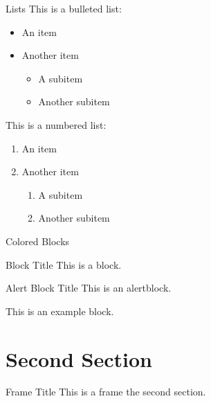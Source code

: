 \documentclass{beamer}
\begin{document}
    \begin{frame}{Lists}
        This is a bulleted list:
        \begin{itemize}
            \item An item

            \item Another item
            \begin{itemize}
                \item A subitem

                \item Another subitem
            \end{itemize}
        \end{itemize}

        This is a numbered list:
        \begin{enumerate}
            \item An item

            \item Another item
            \begin{enumerate}
                \item A subitem

                \item Another subitem
            \end{enumerate}
        \end{enumerate}
    \end{frame}

    \begin{frame}{Colored Blocks}
        \begin{block}{Block Title}
            This is a block.
        \end{block}

        \begin{alertblock}{Alert Block Title}
            This is an alertblock.
        \end{alertblock}

        \begin{example}
            This is an example block.
        \end{example}
    \end{frame}




\section{Second Section}

    \begin{frame}{Frame Title}
        This is a frame the second section.
    \end{frame}
\end{document}

